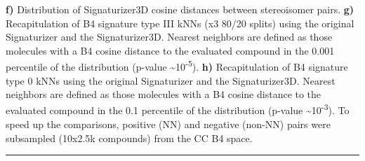 \begin{Figure_modified}
{     \textbf{f)} Distribution of Signaturizer3D cosine distances between stereoisomer pairs.
     \textbf{g)} Recapitulation of B4 signature type III kNNs (x3 80/20 splits) using the original Signaturizer and the Signaturizer3D. Nearest neighbors are defined as those molecules with a B4 cosine distance to the evaluated compound in the 0.001 percentile of the distribution (p-value \textasciitilde10\textsuperscript{-5}).
     \textbf{h)} Recapitulation of B4 signature type 0 kNNs using the original Signaturizer and the Signaturizer3D. Nearest neighbors are defined as those molecules with a B4 cosine distance to the evaluated compound in the 0.1 percentile of the distribution (p-value \textasciitilde10\textsuperscript{-3}). To speed up the comparisons, positive (NN) and negative (non-NN) pairs were subsampled (10x2.5k compounds) from the CC B4 space.
  }
  \vspace{-5mm}
  \rule[0ex]{\textwidth}{0.5pt}
  \vspace{-9mm}
  \label{Stereoisomers_Fig2}
\end{Figure_modified}